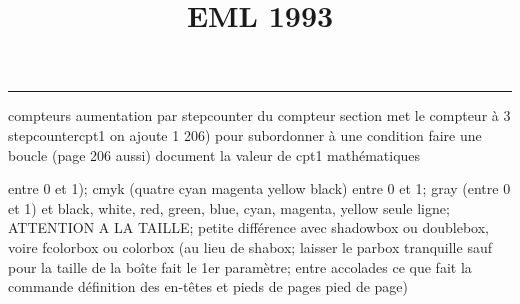 \documentclass[11pt]{article}%
\title{\bf \vspace{-2cm} EML 1993} %
\author{} %
\date{} %
\renewcommand{\headrulewidth}{0pt}%
\renewcommand{\footrulewidth}{0.4pt}%
\begin{document}
\maketitle %
\vspace{-1.4cm}\hrule %
\thispagestyle{fancy}

\vspace*{.2cm}



compteurs%
aumentation par stepcounter du compteur section%
met le compteur à 3%
stepcounter{cpt1} on ajoute 1%
206) pour subordonner à une condition %
faire une boucle (page 206 aussi) %
document la valeur de cpt1 
mathématiques\newcommand{\ch}{\operatorname{ch}} 
\newcommand{\sh}{\operatorname{sh}}
\renewcommand{\tanh}{\operatorname{th}}
\renewcommand{\sinh}{\operatorname{sh}}
\renewcommand{\cosh}{\operatorname{ch}}
\newcommand{\argsh}{\operatorname{argsh}}
\newcommand{\argch}{\operatorname{argch}}
\newcommand{\argth}{\operatorname{argth}}
\newcommand{\ker}{\operatorname{Ker}}
\renewcommand{\im}{\operatorname{Im}}
\newcommand{\rg}{\operatorname{rg}}
\newcommand{\Id}{\operatorname{Id}}
\newcommand{\id}{\operatorname{id}}
\renewcommand{\leq}{\leq}
\renewcommand{\geq}{\geq }

entre 0 et 1); cmyk (quatre cyan magenta yellow black) entre 0 et 1;
gray (entre 0 et 1) et black, white, red, green, blue, cyan, magenta,
yellow%
seule ligne; ATTENTION A LA TAILLE; petite différence avec shadowbox ou
doublebox, voire fcolorbox ou colorbox (au lieu de shabox; laisser le
parbox tranquille sauf pour la taille de la boîte
\newcommand{\Tbox}[1]{\begin{center} \shabox{\parbox{0.6
\linewidth}{#1}} \end{center}} %
fait le 1er paramètre; entre accolades ce que fait la commande
définition des en-têtes et pieds de pages\pagestyle{fancy}
\chead{}
\rfoot[ \ \thepage]{\thepage}
\cfoot{}
\lfoot{}
\thispagestyle{fancy} %
pied de page)\renewcommand{\footrulewidth}{0.4pt}
\renewcommand{\headrulewidth}{0.4pt}
\end{document}
